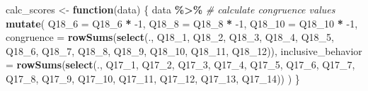 \documentclass[12pt,twoside]{reedthesis}
\newenvironment{Shaded}{\begin{snugshade}}{\end{snugshade}}
\newcommand{\CommentTok}[1]{\textcolor[rgb]{0.56,0.35,0.01}{\textit{#1}}}
\newcommand{\ControlFlowTok}[1]{\textcolor[rgb]{0.13,0.29,0.53}{\textbf{#1}}}
\newcommand{\DataTypeTok}[1]{\textcolor[rgb]{0.13,0.29,0.53}{#1}}
\newcommand{\DecValTok}[1]{\textcolor[rgb]{0.00,0.00,0.81}{#1}}
\newcommand{\KeywordTok}[1]{\textcolor[rgb]{0.13,0.29,0.53}{\textbf{#1}}}
\newcommand{\NormalTok}[1]{#1}
\newcommand{\OperatorTok}[1]{\textcolor[rgb]{0.81,0.36,0.00}{\textbf{#1}}}
\newcommand{\StringTok}[1]{\textcolor[rgb]{0.31,0.60,0.02}{#1}}
\begin{document}
\begin{Shaded}
\begin{Highlighting}[]
\NormalTok{calc\_scores \textless{}{-}}\StringTok{ }\ControlFlowTok{function}\NormalTok{(data) \{}
\NormalTok{  data }\OperatorTok{\%\textgreater{}\%}
\StringTok{    }\CommentTok{\# calculate congruence values}
\StringTok{    }\KeywordTok{mutate}\NormalTok{(}
      \DataTypeTok{Q18\_6 =}\NormalTok{ Q18\_}\DecValTok{6} \OperatorTok{*}\StringTok{ }\DecValTok{{-}1}\NormalTok{,}
      \DataTypeTok{Q18\_8 =}\NormalTok{ Q18\_}\DecValTok{8} \OperatorTok{*}\StringTok{ }\DecValTok{{-}1}\NormalTok{,}
      \DataTypeTok{Q18\_10 =}\NormalTok{ Q18\_}\DecValTok{10} \OperatorTok{*}\StringTok{ }\DecValTok{{-}1}\NormalTok{,}
      \DataTypeTok{congruence =} \KeywordTok{rowSums}\NormalTok{(}\KeywordTok{select}\NormalTok{(., Q18\_}\DecValTok{1}\NormalTok{, Q18\_}\DecValTok{2}\NormalTok{, Q18\_}\DecValTok{3}\NormalTok{, Q18\_}\DecValTok{4}\NormalTok{, Q18\_}\DecValTok{5}\NormalTok{, Q18\_}\DecValTok{6}\NormalTok{, Q18\_}\DecValTok{7}\NormalTok{, Q18\_}\DecValTok{8}\NormalTok{, Q18\_}\DecValTok{9}\NormalTok{, Q18\_}\DecValTok{10}\NormalTok{, Q18\_}\DecValTok{11}\NormalTok{, Q18\_}\DecValTok{12}\NormalTok{)),}
      \DataTypeTok{inclusive\_behavior =} \KeywordTok{rowSums}\NormalTok{(}\KeywordTok{select}\NormalTok{(., Q17\_}\DecValTok{1}\NormalTok{, Q17\_}\DecValTok{2}\NormalTok{, Q17\_}\DecValTok{3}\NormalTok{, Q17\_}\DecValTok{4}\NormalTok{, Q17\_}\DecValTok{5}\NormalTok{, Q17\_}\DecValTok{6}\NormalTok{, Q17\_}\DecValTok{7}\NormalTok{, Q17\_}\DecValTok{8}\NormalTok{, Q17\_}\DecValTok{9}\NormalTok{, Q17\_}\DecValTok{10}\NormalTok{, Q17\_}\DecValTok{11}\NormalTok{, Q17\_}\DecValTok{12}\NormalTok{, Q17\_}\DecValTok{13}\NormalTok{, Q17\_}\DecValTok{14}\NormalTok{))}
\NormalTok{      ) }
\NormalTok{\}}


\end{Highlighting}
\end{Shaded}
\end{document}

